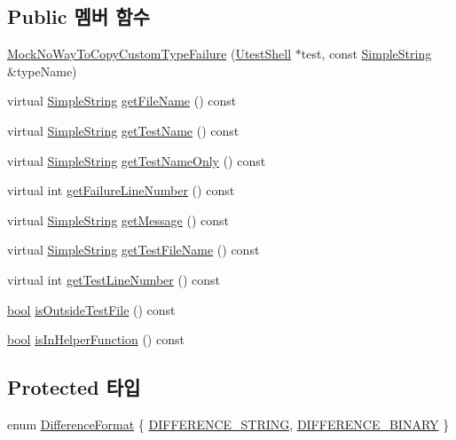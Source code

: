 \subsection*{Public 멤버 함수}
\begin{DoxyCompactItemize}
\item 
\hyperlink{class_mock_no_way_to_copy_custom_type_failure_a5644a7bbda544c752594758e80630b15}{Mock\+No\+Way\+To\+Copy\+Custom\+Type\+Failure} (\hyperlink{class_utest_shell}{Utest\+Shell} $\ast$test, const \hyperlink{class_simple_string}{Simple\+String} \&type\+Name)
\item 
virtual \hyperlink{class_simple_string}{Simple\+String} \hyperlink{class_test_failure_ac74fa65c497d9a175304a14ffafcaa1a}{get\+File\+Name} () const 
\item 
virtual \hyperlink{class_simple_string}{Simple\+String} \hyperlink{class_test_failure_a02da3865d8c38e5fd122a08a5e23773e}{get\+Test\+Name} () const 
\item 
virtual \hyperlink{class_simple_string}{Simple\+String} \hyperlink{class_test_failure_ac5e7fcbcf3831504c42ee41691b0a7e7}{get\+Test\+Name\+Only} () const 
\item 
virtual int \hyperlink{class_test_failure_a9d41f8ad9667ed1f471676d49a655ec7}{get\+Failure\+Line\+Number} () const 
\item 
virtual \hyperlink{class_simple_string}{Simple\+String} \hyperlink{class_test_failure_a55ca73e984d01e477b9cc990acf7dffd}{get\+Message} () const 
\item 
virtual \hyperlink{class_simple_string}{Simple\+String} \hyperlink{class_test_failure_a2fb8d164bb0730492e0140ec8080f13f}{get\+Test\+File\+Name} () const 
\item 
virtual int \hyperlink{class_test_failure_a9fd9b831dfada83bbc2a1847918080a6}{get\+Test\+Line\+Number} () const 
\item 
\hyperlink{avb__gptp_8h_af6a258d8f3ee5206d682d799316314b1}{bool} \hyperlink{class_test_failure_a977b24b749f7dc0d279fed902991c7b4}{is\+Outside\+Test\+File} () const 
\item 
\hyperlink{avb__gptp_8h_af6a258d8f3ee5206d682d799316314b1}{bool} \hyperlink{class_test_failure_a8658daf09d68f724672ed9c7b1d94e95}{is\+In\+Helper\+Function} () const 
\end{DoxyCompactItemize}
\subsection*{Protected 타입}
\begin{DoxyCompactItemize}
\item 
enum \hyperlink{class_test_failure_aaadecd271c82449768993cbf919de0a2}{Difference\+Format} \{ \hyperlink{class_test_failure_aaadecd271c82449768993cbf919de0a2a1246a1a469970104212c9113e3f057c9}{D\+I\+F\+F\+E\+R\+E\+N\+C\+E\+\_\+\+S\+T\+R\+I\+NG}, 
\hyperlink{class_test_failure_aaadecd271c82449768993cbf919de0a2af76cc43dfdf0618b3cb16196894d5929}{D\+I\+F\+F\+E\+R\+E\+N\+C\+E\+\_\+\+B\+I\+N\+A\+RY}
 \}
\end{DoxyCompactItemize}

